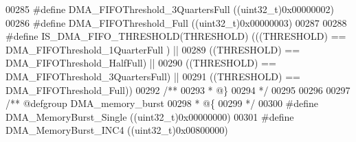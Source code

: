 \begin{DoxyCode}
00285 \textcolor{preprocessor}{#}\textcolor{preprocessor}{define} \textcolor{preprocessor}{DMA\_FIFOThreshold\_3QuartersFull}   \textcolor{preprocessor}{(}\textcolor{preprocessor}{(}\textcolor{preprocessor}{uint32\_t}\textcolor{preprocessor}{)}0x00000002\textcolor{preprocessor}{)}
00286 \textcolor{preprocessor}{#}\textcolor{preprocessor}{define} \textcolor{preprocessor}{DMA\_FIFOThreshold\_Full}            \textcolor{preprocessor}{(}\textcolor{preprocessor}{(}\textcolor{preprocessor}{uint32\_t}\textcolor{preprocessor}{)}0x00000003\textcolor{preprocessor}{)}
00287 
00288 \textcolor{preprocessor}{#}\textcolor{preprocessor}{define} \textcolor{preprocessor}{IS\_DMA\_FIFO\_THRESHOLD}\textcolor{preprocessor}{(}\textcolor{preprocessor}{THRESHOLD}\textcolor{preprocessor}{)} \textcolor{preprocessor}{(}\textcolor{preprocessor}{(}\textcolor{preprocessor}{(}\textcolor{preprocessor}{THRESHOLD}\textcolor{preprocessor}{)} \textcolor{preprocessor}{==} 
      DMA_FIFOThreshold_1QuarterFull \textcolor{preprocessor}{)} \textcolor{preprocessor}{||}
00289                                           \textcolor{preprocessor}{(}\textcolor{preprocessor}{(}\textcolor{preprocessor}{THRESHOLD}\textcolor{preprocessor}{)} \textcolor{preprocessor}{==} 
      DMA_FIFOThreshold_HalfFull\textcolor{preprocessor}{)}      \textcolor{preprocessor}{||}
00290                                           \textcolor{preprocessor}{(}\textcolor{preprocessor}{(}\textcolor{preprocessor}{THRESHOLD}\textcolor{preprocessor}{)} \textcolor{preprocessor}{==} 
      DMA_FIFOThreshold_3QuartersFull\textcolor{preprocessor}{)} \textcolor{preprocessor}{||}
00291                                           \textcolor{preprocessor}{(}\textcolor{preprocessor}{(}\textcolor{preprocessor}{THRESHOLD}\textcolor{preprocessor}{)} \textcolor{preprocessor}{==} 
      DMA_FIFOThreshold_Full\textcolor{preprocessor}{)}\textcolor{preprocessor}{)}
00292 \textcolor{comment}{/**}
00293 \textcolor{comment}{  * @\}}
00294 \textcolor{comment}{  */}
00295 
00296 
00297 \textcolor{comment}{/** @defgroup DMA\_memory\_burst }
00298 \textcolor{comment}{  * @\{}
00299 \textcolor{comment}{  */}
00300 \textcolor{preprocessor}{#}\textcolor{preprocessor}{define} \textcolor{preprocessor}{DMA\_MemoryBurst\_Single}            \textcolor{preprocessor}{(}\textcolor{preprocessor}{(}\textcolor{preprocessor}{uint32\_t}\textcolor{preprocessor}{)}0x00000000\textcolor{preprocessor}{)}
00301 \textcolor{preprocessor}{#}\textcolor{preprocessor}{define} \textcolor{preprocessor}{DMA\_MemoryBurst\_INC4}              \textcolor{preprocessor}{(}\textcolor{preprocessor}{(}\textcolor{preprocessor}{uint32\_t}\textcolor{preprocessor}{)}0x00800000\textcolor{preprocessor}{)}

\end{DoxyCode}
